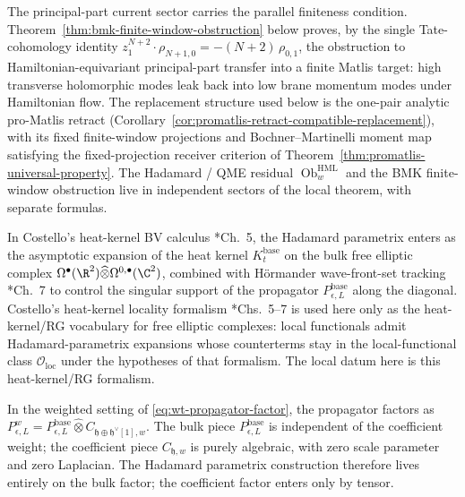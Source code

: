 The principal-part current sector carries the parallel finiteness
condition.  Theorem~\ref{thm:bmk-finite-window-obstruction} below
proves, by the single
Tate-cohomology identity
\(z_1^{N+2}\cdot\rho_{N+1,0}=-(N+2)\,\rho_{0,1}\), the obstruction to
Hamiltonian-equivariant principal-part transfer into a finite Matlis
target: high transverse holomorphic modes leak back into low brane
momentum modes under Hamiltonian flow.  The replacement structure used
below is the one-pair analytic pro-Matlis retract
  (Corollary~\ref{cor:promatlis-retract-compatible-replacement}), with its fixed
  finite-window projections and Bochner--Martinelli moment map satisfying
  the fixed-projection receiver criterion of
  Theorem~\ref{thm:promatlis-universal-property}.  The Hadamard / QME
residual \(\operatorname{Ob}^{\mathrm{HML}}_{w}\) and the BMK
finite-window obstruction live in independent sectors of the local
theorem, with separate formulas.

\begin{rmk}\label{rmk:hadamard-factorization}
  In Costello's heat-kernel BV calculus
  \cite{costello-renormalization}*{Ch.~5}, the Hadamard parametrix
  enters as the asymptotic expansion of the heat kernel
  $K_t^{\mathrm{base}}$ on the bulk free elliptic complex
  $\Omega^\bullet(\R^2)\widehat\otimes\Omega^{0,\bullet}(\C^2)$,
  combined with Hörmander wave-front-set tracking
  \cite{hormander-vol1}*{Ch.~7} to control the singular support of the
  propagator $P_{\epsilon,L}^{\mathrm{base}}$ along the diagonal.
  Costello's heat-kernel locality formalism
  \cite{costello-renormalization}*{Chs.~5--7} is used here only as the
  heat-kernel/RG vocabulary for free elliptic complexes: local
  functionals admit Hadamard-parametrix expansions whose counterterms
  stay in the local-functional class $\mathcal O_{\mathrm{loc}}$ under
  the hypotheses of that formalism.  The local datum here is this
  heat-kernel/RG formalism.

  In the weighted setting of \ref{eq:wt-propagator-factor}, the
  propagator factors as
  $P_{\epsilon,L}^{w}=P_{\epsilon,L}^{\mathrm{base}}\widehat\otimes
   C_{\mathfrak h\oplus\mathfrak h^\vee[1],w}$. The bulk piece
	  $P_{\epsilon,L}^{\mathrm{base}}$ is independent of the coefficient
	  weight; the coefficient piece $C_{\mathfrak h,w}$ is purely
	  algebraic, with zero scale parameter and zero Laplacian. The Hadamard
  parametrix construction therefore lives entirely on the bulk
  factor; the coefficient factor enters only by tensor.
\end{rmk}

